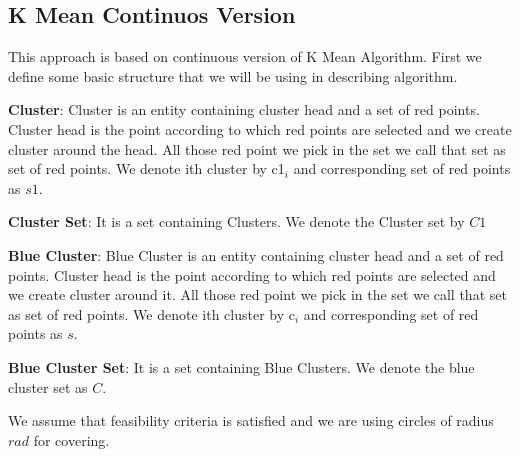 \documentclass[12pt,a4wide]{report}
\theoremstyle{plain}
\theoremstyle{definition}
\theoremstyle{remark}
\begin{document}
\subsection{K Mean Continuos Version}
This approach is based on continuous version of K Mean Algorithm. First we define some basic structure
that we will be using in describing algorithm.
\begin{description}
 \item \textbf{Cluster}: Cluster is an entity containing cluster head and a set of red points. Cluster head is the point according to 
  which red points are selected and we create cluster around the head. All those red point we pick in the set we call that set as set of red points.  
  We denote ith cluster by c1$_{i}$ and corresponding set of red points as $s1$.
 \item \textbf{Cluster Set}: It is a set containing Clusters. We denote the Cluster set by $C1$
 \item \textbf{Blue Cluster}: Blue Cluster is an entity containing cluster head and a set of red points. Cluster head is the point according to 
  which red points are selected and we create cluster around it. All those red point we pick in the set we call that set as set of red points.
   We denote ith cluster by c$_{i}$ and corresponding set of red points as $s$.
 \item \textbf{Blue Cluster Set}: It is a set containing Blue Clusters. We denote the blue cluster set as $C$.
 \end{description}
We assume that feasibility criteria is satisfied and we are using circles of radius $rad$ for covering. \\
\end{document}
